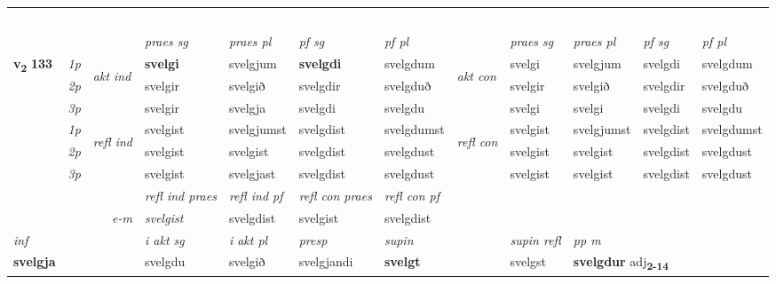 \begin{longtable}[l]{X>{\footnotesize\itshape}llXXXXlXXXX}
\midrule
 & \\*
  & \\*
   & \\*
   & \\*
  & \\
   \midrule
 & &   & \textit{praes sg}  & \textit{praes pl}    & \textit{ pf sg} & \textit{pf pl} & & \textit{praes sg}  & \textit{praes pl}    & \textit{pf sg} & \textit{pf pl }  \\ \cmidrule{4-7} \cmidrule{9-12}
 \multirow{2}{*}{{{\textbf{v{\textsubscript{2}}} \Large{\textbf{133}}}}}  & 1p & \multirow{3}{*}{\begin{turn}{90}\textit{akt ind}\end{turn}} & \textbf{svelgi} & svelgjum & \textbf{svelgdi} & svelgdum & \multirow{3}{*}{\begin{turn}{90}\textit{akt con}\end{turn}} &svelgi & svelgjum & svelgdi & svelgdum\\*
 & 2p &  &  svelgir  & svelgið & svelgdir & svelgduð & & svelgir & svelgið & svelgdir & svelgduð \\*
 & 3p &  & svelgir & svelgja & svelgdi & svelgdu & & svelgi & svelgi& svelgdi & svelgdu \\*
\cmidrule{4-7} \cmidrule{9-12}
 & 1p & \multirow{3}{*}{\begin{turn}{90}\textit{refl ind}\end{turn}}  & svelgist & svelgjumst & svelgdist & svelgdumst & \multirow{3}{*}{\begin{turn}{90}\textit{refl con}\end{turn}}  &svelgist & svelgjumst & svelgdist & svelgdumst \\*
 & 2p &  & svelgist & svelgist & svelgdist & svelgdust & &svelgist & svelgist & svelgdist & svelgdust \\*
 & 3p  & & svelgist & svelgjast & svelgdist & svelgdust & & svelgist & svelgist& svelgdist & svelgdust \\*
\cmidrule{4-7} \cmidrule{9-12}

 & && \textit{refl ind praes} & \textit{refl ind pf} & \textit{refl con praes} & \textit{refl con pf} \\*
\multicolumn{3}{r}{\textit{e-m}}& svelgist & svelgdist & svelgist & svelgdist \\*

\cmidrule{4-7}
   {\textit{inf}} & &  & \textit{i akt sg} & \textit{i akt pl}   & \textit{presp} & \textit{supin} && \textit{supin refl} & \textit{pp m} \\*
  {\textbf{svelgja}} & && svelgdu  & svelgið   & svelgjandi &  \textbf{svelgt} && svelgst & \multicolumn{2}{l}{\textbf{svelgdur} adj\textbf{\textsubscript{2-14}}} \\*


\end{longtable}
